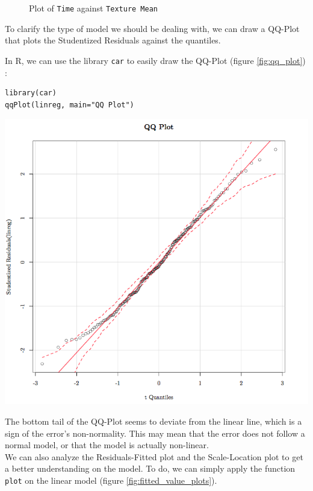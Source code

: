 \documentclass[]{report}
\newcommand{\inputtikz}[2]{%
	\scalebox{#1}{}  
}
\begin{document}
\begin{figure}[!h]
	\centering
	\inputtikz{0.5}{Figures/time_feature_ex1.tex}
	\caption{Plot of \texttt{Time} against \texttt{Texture Mean} }
	\label{fig:time_feature_ex1}
\end{figure}

To clarify the type of model we should be dealing with, we can draw a QQ-Plot that plots the Studentized Residuals against the quantiles. 

In R, we can use the library \texttt{car} to easily draw the QQ-Plot (figure \ref{fig:qq_plot}) :
\begin{lstlisting}
library(car)
qqPlot(linreg, main="QQ Plot")
\end{lstlisting}

\begin{center}
	\includegraphics[width=0.8\linewidth]{Figures/qq_plot}
	\label{fig:qq_plot}
\end{center}

The bottom tail of the QQ-Plot seems to deviate from the linear line, which is a sign of the error's non-normality. This may mean that the error does not follow a normal model, or that the model is actually non-linear.\\
We can also analyze the Residuals-Fitted plot and the Scale-Location plot to get a better understanding on the model. To do, we can simply apply the function \texttt{plot} on the linear model (figure \ref{fig:fitted_value_plots}).
\end{document}
